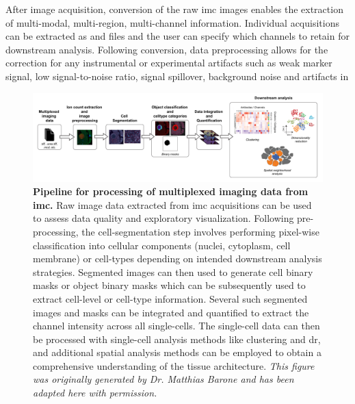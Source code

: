 
\par After image acquisition, conversion of the raw \gls{imc} images enables the extraction of multi-modal, multi-region, multi-channel information. Individual acquisitions can be extracted as  and  files and the user can specify which channels to retain for downstream analysis. Following conversion, data preprocessing allows for the correction for any instrumental or experimental artifacts such as weak marker signal, low signal-to-noise ratio, signal spillover, background noise and artifacts in 

\begin{figure}[H]
    \centering
    \includegraphics[width=\linewidth]{Chapter1/Fig/F1-14-01.png}
    \caption[Overview of Imaging Mass Cytometry data analysis workflow]{\textbf{Pipeline for processing of multiplexed imaging data from \gls{imc}.} Raw image data extracted from \gls{imc} acquisitions can be used to assess data quality and exploratory visualization. Following pre-processing, the cell-segmentation step involves performing pixel-wise classification into cellular components (nuclei, cytoplasm, cell membrane) or cell-types depending on intended downstream analysis strategies. Segmented images can then used to generate cell binary masks or object binary masks which can be subsequently used to extract cell-level or cell-type information. Several such segmented images and masks can be integrated and quantified to extract the channel intensity across all single-cells. The single-cell data can then be processed with single-cell analysis methods like clustering and \gls{dr}, and additional spatial analysis methods can be employed to obtain a comprehensive understanding of the tissue architecture. \textit{This figure was originally generated by Dr. Matthias Barone and has been adapted here with permission.}}
    \label{fig:chp1_imc_analysis}
\end{figure}


